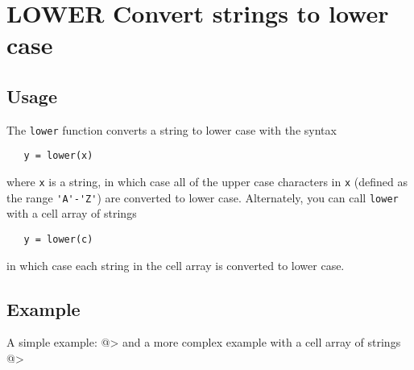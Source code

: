 \section{LOWER Convert strings to lower case}

\subsection{Usage}

The \verb|lower| function converts a string to lower case with
the syntax
\begin{verbatim}
   y = lower(x)
\end{verbatim}
where \verb|x| is a string, in which case all of the upper case
characters in \verb|x| (defined as the range \verb|'A'-'Z'|) are
converted to lower case.  Alternately, you can call \verb|lower|
with a cell array of strings
\begin{verbatim}
   y = lower(c)
\end{verbatim}
in which case each string in the cell array is converted to lower case.
\subsection{Example}

A simple example:
@>
and a more complex example with a cell array of strings
@>
